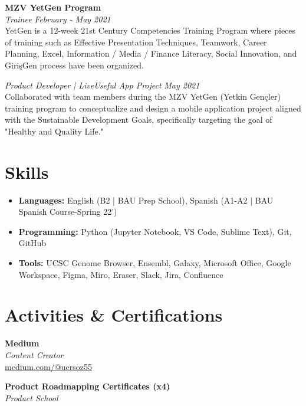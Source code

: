 \documentclass[a4paper,10pt]{article}
\newcommand{\sepspace}{\noindent\makebox[\linewidth]{\rule{\textwidth}{0.4pt}}}
\begin{document}
\noindent\textbf{MZV YetGen Program} \\
\textit{Trainee} \hfill \textit{February - May 2021} \\
YetGen is a 12-week 21st Century Competencies Training Program where pieces of training such as Effective Presentation Techniques, Teamwork, Career Planning, Excel, Information / Media / Finance Literacy, Social Innovation, and GirişGen process have been organized.

\vspace{0.3cm}

\noindent\textit{Product Developer | LiveUseful App Project} \hfill \textit{May 2021} \\
Collaborated with team members during the MZV YetGen (Yetkin Gençler) training program to conceptualize and design a mobile application project aligned with the Sustainable Development Goals, specifically targeting the goal of "Healthy and Quality Life."

\sepspace

\section*{Skills}
\begin{itemize}[noitemsep]
    \item \textbf{Languages:} English (B2 | BAU Prep School), Spanish (A1-A2 | BAU Spanish Course-Spring 22')
    \item \textbf{Programming:} Python (Jupyter Notebook, VS Code, Sublime Text), Git, GitHub
    \item \textbf{Tools:} UCSC Genome Browser, Ensembl, Galaxy, Microsoft Office, Google Workspace, Figma, Miro, Eraser, Slack, Jira, Confluence
\end{itemize}

\sepspace

\section*{Activities \& Certifications}
\noindent\textbf{Medium} \\
\textit{Content Creator} \\
\href{https://medium.com/@uersoz55}{medium.com/@uersoz55}

\vspace{0.3cm}


\noindent\textbf{Product Roadmapping Certificates (x4)} \\
\textit{Product School}
\end{document}
